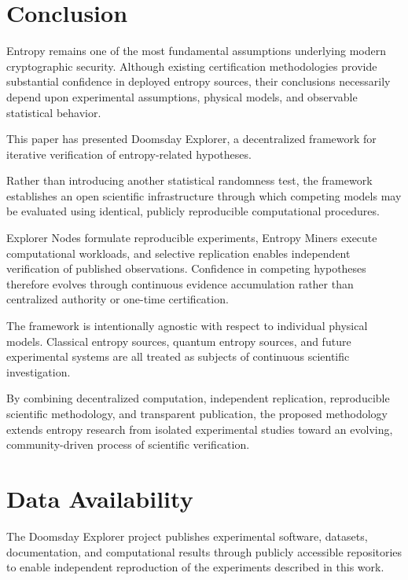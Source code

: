 \documentclass[11pt]{article}
\begin{document}
\section{Conclusion}

Entropy remains one of the most fundamental assumptions
underlying modern cryptographic security.
Although existing certification methodologies provide
substantial confidence in deployed entropy sources,
their conclusions necessarily depend upon
experimental assumptions,
physical models,
and observable statistical behavior.

This paper has presented
Doomsday Explorer,
a decentralized framework for
iterative verification of entropy-related hypotheses.

Rather than introducing another statistical randomness test,
the framework establishes
an open scientific infrastructure
through which competing models
may be evaluated using identical,
publicly reproducible computational procedures.

Explorer Nodes formulate reproducible experiments,
Entropy Miners execute computational workloads,
and selective replication enables
independent verification of published observations.
Confidence in competing hypotheses
therefore evolves through
continuous evidence accumulation
rather than centralized authority
or one-time certification.

The framework is intentionally agnostic
with respect to individual physical models.
Classical entropy sources,
quantum entropy sources,
and future experimental systems
are all treated as subjects
of continuous scientific investigation.

By combining decentralized computation, independent replication, reproducible scientific methodology,
and transparent publication,
the proposed methodology
extends entropy research
from isolated experimental studies
toward an evolving,
community-driven process
of scientific verification.


\section*{Data Availability}

The Doomsday Explorer project publishes
experimental software,
datasets,
documentation,
and computational results
through publicly accessible repositories
to enable independent reproduction
of the experiments described in this work.
\end{document}
